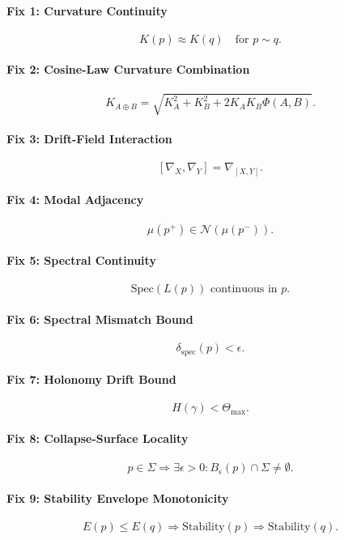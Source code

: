 \paragraph{Fix 1: Curvature Continuity}
\[
K(p) \approx K(q) \quad \text{for } p \sim q.
\]

\paragraph{Fix 2: Cosine-Law Curvature Combination}
\[
K_{A\oplus B}
  = \sqrt{K_A^2 + K_B^2 + 2 K_A K_B \Phi(A,B)}.
\]

\paragraph{Fix 3: Drift-Field Interaction}
\[
[\nabla_X,\nabla_Y] = \nabla_{[X,Y]}.
\]

\paragraph{Fix 4: Modal Adjacency}
\[
\mu(p^+) \in \mathcal{N}(\mu(p^-)).
\]

\paragraph{Fix 5: Spectral Continuity}
\[
\mathrm{Spec}(L(p)) \text{ continuous in } p.
\]

\paragraph{Fix 6: Spectral Mismatch Bound}
\[
\delta_{\mathrm{spec}}(p) < \epsilon.
\]

\paragraph{Fix 7: Holonomy Drift Bound}
\[
H(\gamma) < \Theta_{\max}.
\]

\paragraph{Fix 8: Collapse-Surface Locality}
\[
p \in \Sigma \Rightarrow \exists \epsilon > 0 : B_\epsilon(p) \cap \Sigma \neq \emptyset.
\]

\paragraph{Fix 9: Stability Envelope Monotonicity}
\[
E(p) \le E(q) \Rightarrow \text{Stability}(p) \Rightarrow \text{Stability}(q).
\]


